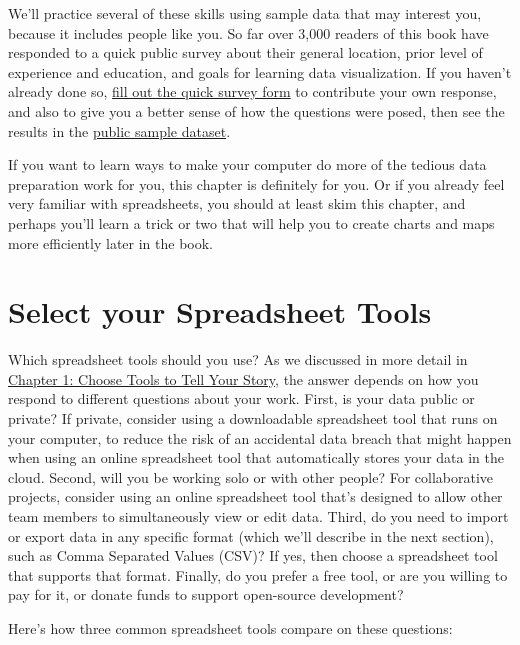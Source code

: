 \documentclass[
  english,
]{book}
\begin{document}
We'll practice several of these skills using sample data that may interest you, because it includes people like you. So far over 3,000 readers of this book have responded to a quick public survey about their general location, prior level of experience and education, and goals for learning data visualization. If you haven't already done so, \href{https://forms.gle/yn5QwTzfQkYcppQn9}{fill out the quick survey form} to contribute your own response, and also to give you a better sense of how the questions were posed, then see the results in the \href{https://docs.google.com/spreadsheets/d/1egX_akJccnCSzdk1aaDdtrEGe5HcaTrlOW-Yf6mJ3Uo}{public sample dataset}.

If you want to learn ways to make your computer do more of the tedious data preparation work for you, this chapter is definitely for you. Or if you already feel very familiar with spreadsheets, you should at least skim this chapter, and perhaps you'll learn a trick or two that will help you to create charts and maps more efficiently later in the book.

\hypertarget{spreadsheet-tools}{%
\section*{Select your Spreadsheet Tools}\label{spreadsheet-tools}}

Which spreadsheet tools should you use? As we discussed in more detail in \href{choose.html}{Chapter 1: Choose Tools to Tell Your Story}, the answer depends on how you respond to different questions about your work. First, is your data public or private? If private, consider using a downloadable spreadsheet tool that runs on your computer, to reduce the risk of an accidental data breach that might happen when using an online spreadsheet tool that automatically stores your data in the cloud. Second, will you be working solo or with other people? For collaborative projects, consider using an online spreadsheet tool that's designed to allow other team members to simultaneously view or edit data. Third, do you need to import or export data in any specific format (which we'll describe in the next section), such as Comma Separated Values (CSV)? If yes, then choose a spreadsheet tool that supports that format. Finally, do you prefer a free tool, or are you willing to pay for it, or donate funds to support open-source development?

Here's how three common spreadsheet tools compare on these questions:
\end{document}
